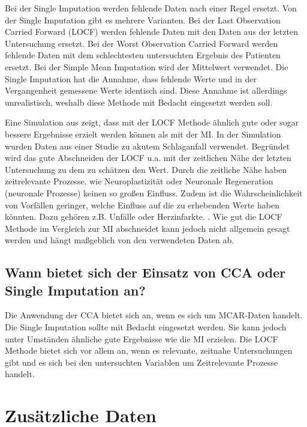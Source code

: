 Bei der Single Imputation werden fehlende Daten nach einer Regel ersetzt. Von der Single Imputation gibt es mehrere 
Varianten. Bei der Last Observation Carried Forward (LOCF) werden fehlende Daten mit den Daten aus der letzten 
Untersuchung ersetzt. Bei der Worst Observation Carried Forward werden fehlende Daten mit dem schlechtesten untersuchten 
Ergebnis des Patienten ersetzt. Bei der Simple Mean Imputation wird der Mittelwert verwendet. Die Single Imputation hat 
die Annahme, dass fehlende Werte und in der Vergangenheit gemessene Werte identisch sind. Diese Annahme ist allerdings 
unrealistisch, weshalb diese Methode mit Bedacht eingesetzt werden soll.
\autocite[3]{Jakobsen2017}

Eine Simulation aus \textcite[]{Young-Saver2018} zeigt, dass mit der LOCF Methode ähnlich gute oder sogar bessere 
Ergebnisse erzielt werden können als mit der MI. In der Simulation wurden Daten aus einer Studie zu akutem Schlaganfall 
verwendet. Begründet wird das gute Abschneiden der LOCF u.a. mit der zeitlichen Nähe der letzten Untersuchung zu dem zu 
schätzen den Wert. Durch die zeitliche Nähe haben zeitrelevante Prozesse, wie Neuroplastizität oder Neuronale Regeneration 
(neuronale Prozesse) keinen so großen Einfluss. Zudem ist die Wahrscheinlichkeit von Vorfällen geringer, welche Einfluss 
auf die zu erhebenden Werte haben könnten. Dazu gehören z.B. Unfälle oder Herzinfarkte. \autocite[3667]{Young-Saver2018}. 
Wie gut die LOCF Methode im Vergleich zur MI abschneidet kann jedoch nicht allgemein gesagt werden und hängt maßgeblich 
von den verwendeten Daten ab. 


\subsection{Wann bietet sich der Einsatz von CCA oder Single Imputation an?}

Die Anwendung der CCA bietet sich an, wenn es sich um MCAR-Daten handelt. 
Die Single Imputation sollte mit Bedacht eingesetzt werden. Sie kann jedoch unter Umständen ähnliche gute Ergebnisse 
wie die MI erzielen. Die LOCF Methode bietet sich vor allem an, wenn es relevante, zeitnahe Untersuchungen gibt und es 
sich bei den untersuchten Variablen um Zeitrelevante Prozesse handelt. 


\section{Zusätzliche Daten}
\label{section:additional_data}

